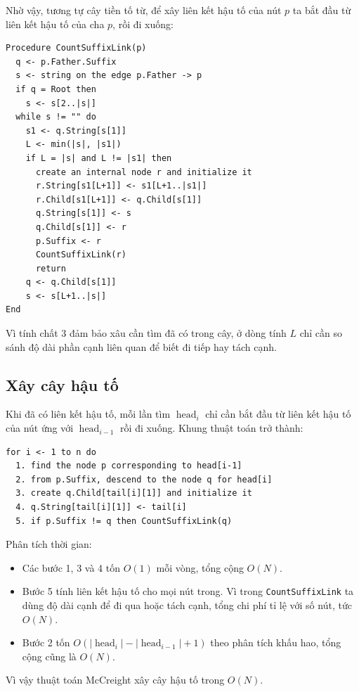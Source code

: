 \documentclass[11pt]{article}
\begin{document}
Nhờ vậy, tương tự cây tiền tố từ, để xây liên kết hậu tố của nút $p$ ta bắt
đầu từ liên kết hậu tố của cha $p$, rồi đi xuống:

\begin{verbatim}
Procedure CountSuffixLink(p)
  q <- p.Father.Suffix
  s <- string on the edge p.Father -> p
  if q = Root then
    s <- s[2..|s|]
  while s != "" do
    s1 <- q.String[s[1]]
    L <- min(|s|, |s1|)
    if L = |s| and L != |s1| then
      create an internal node r and initialize it
      r.String[s1[L+1]] <- s1[L+1..|s1|]
      r.Child[s1[L+1]] <- q.Child[s[1]]
      q.String[s[1]] <- s
      q.Child[s[1]] <- r
      p.Suffix <- r
      CountSuffixLink(r)
      return
    q <- q.Child[s[1]]
    s <- s[L+1..|s|]
End
\end{verbatim}

Vì tính chất 3 đảm bảo xâu cần tìm đã có trong cây, ở dòng tính $L$ chỉ cần so
sánh độ dài phần cạnh liên quan để biết đi tiếp hay tách cạnh.

\subsection{Xây cây hậu tố}

Khi đã có liên kết hậu tố, mỗi lần tìm $\operatorname{head}_i$ chỉ cần bắt đầu
từ liên kết hậu tố của nút ứng với $\operatorname{head}_{i-1}$ rồi đi xuống.
Khung thuật toán trở thành:

\begin{verbatim}
for i <- 1 to n do
  1. find the node p corresponding to head[i-1]
  2. from p.Suffix, descend to the node q for head[i]
  3. create q.Child[tail[i][1]] and initialize it
  4. q.String[tail[i][1]] <- tail[i]
  5. if p.Suffix != q then CountSuffixLink(q)
\end{verbatim}

Phân tích thời gian:
\begin{itemize}
  \item Các bước 1, 3 và 4 tốn $O(1)$ mỗi vòng, tổng cộng $O(N)$.
  \item Bước 5 tính liên kết hậu tố cho mọi nút trong. Vì trong
  \texttt{CountSuffixLink} ta dùng độ dài cạnh để đi qua hoặc tách cạnh, tổng
  chi phí tỉ lệ với số nút, tức $O(N)$.
  \item Bước 2 tốn $O(|\operatorname{head}_i|-|\operatorname{head}_{i-1}|+1)$
  theo phân tích khấu hao, tổng cộng cũng là $O(N)$.
\end{itemize}
Vì vậy thuật toán McCreight xây cây hậu tố trong $O(N)$.
\end{document}
